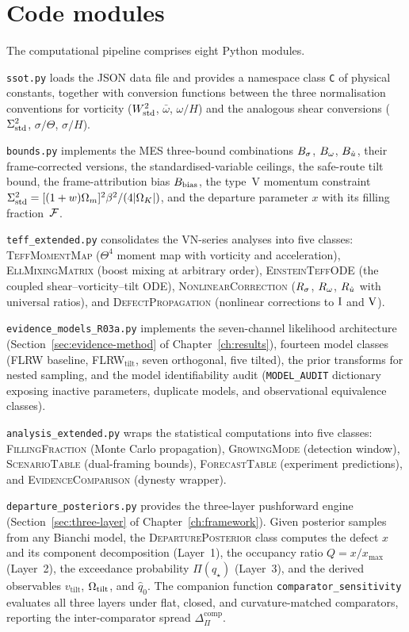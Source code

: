 \section{Code modules}\label{sec:code-modules}

The computational pipeline comprises eight Python modules.

\texttt{ssot.py} loads the JSON data file and provides a
namespace class \texttt{C} of physical constants, together with
conversion functions between the three normalisation conventions
for vorticity ($W^2_{\mathrm{std}}$, $\bar{\omega}$, $\omega/H$) and the
analogous shear conversions ($\Sigma^2_{\mathrm{std}}$, $\sigma/\Theta$,
$\sigma/H$).

\texttt{bounds.py} implements the MES three-bound combinations
$B_\sigma$, $B_\omega$, $B_{\dot{u}}$, their frame-corrected versions, the
standardised-variable ceilings, the safe-route tilt bound,
the frame-attribution bias $B_{\mathrm{bias}}$, the type~V momentum
constraint $\Sigma^2_{\mathrm{std}} = [(1+w)\Omega_m]^2\beta^2/(4|\Omega_K|)$,
and the departure parameter $x$ with its filling fraction~$\mathcal{F}$.

\texttt{teff\_extended.py} consolidates the VN-series analyses
into five classes: \textsc{TeffMomentMap} ($\Theta^4$ moment
map with vorticity and acceleration),
\textsc{EllMixingMatrix} (boost mixing at arbitrary order),
\textsc{EinsteinTeffODE} (the coupled shear--vorticity--tilt
ODE), \textsc{NonlinearCorrection} ($R_\sigma$, $R_\omega$, $R_{\dot{u}}$
with universal ratios), and \textsc{DefectPropagation}
(nonlinear corrections to $\mathrm{I}$ and $\mathrm{V}$).

\texttt{evidence\_models\_R03a.py} implements the seven-channel
likelihood architecture
(Section~\ref{sec:evidence-method} of
Chapter~\ref{ch:results}), fourteen model classes (FLRW baseline,
FLRW$_{\mathrm{tilt}}$, seven orthogonal, five tilted), the
prior transforms for nested sampling, and
the model identifiability audit (\texttt{MODEL\_AUDIT}
dictionary exposing inactive parameters, duplicate models, and
observational equivalence classes).

\texttt{analysis\_extended.py} wraps the statistical
computations into five classes: \textsc{FillingFraction}
(Monte Carlo propagation), \textsc{GrowingMode} (detection
window), \textsc{ScenarioTable} (dual-framing bounds),
\textsc{ForecastTable} (experiment predictions), and
\textsc{EvidenceComparison} (dynesty wrapper).

\texttt{departure\_posteriors.py} provides the three-layer
pushforward engine (Section~\ref{sec:three-layer} of
Chapter~\ref{ch:framework}).  Given posterior samples from any
Bianchi model, the \textsc{DeparturePosterior} class computes
the defect $x$ and its component decomposition (Layer~1), the
occupancy ratio $Q = x / x_{\max}$ (Layer~2), the exceedance
probability $\Pi(q_\star)$ (Layer~3), and the derived
observables $v_{\mathrm{tilt}}$, $\Omega_{\mathrm{tilt}}$, and $\hat{q}_0$.
The companion function \texttt{comparator\_sensitivity}
evaluates all three layers under flat, closed, and
curvature-matched comparators, reporting the inter-comparator
spread $\Delta_\Pi^{\mathrm{comp}}$.

